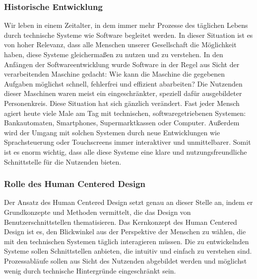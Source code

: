 \subsubsection{Historische Entwicklung}
Wir leben in einem Zeitalter, in dem immer mehr Prozesse des täglichen Lebens
durch technische Systeme wie Software begleitet werden. In dieser Situation ist
es von hoher Relevanz, dass alle Menschen unserer Gesellschaft die Möglichkeit
haben, diese Systeme gleichermaßen zu nutzen und zu verstehen. In den Anfängen
der Softwareentwicklung wurde Software in der Regel aus Sicht der
verarbeitenden Maschine gedacht: Wie kann die Maschine die gegebenen Aufgaben
möglichst schnell, fehlerfrei und effizient abarbeiten? Die Nutzenden dieser
Maschinen waren meist ein eingeschränkter, speziell dafür ausgebildeter
Personenkreis. Diese Situation hat sich gänzlich verändert. Fast jeder Mensch
agiert heute viele Male am Tag mit technischen, softwaregetriebenen Systemen:
Bankautomaten, Smartphones, Supermarktkassen oder Computer. Außerdem wird der
Umgang mit solchen Systemen durch neue Entwicklungen wie Sprachsteuerung oder
Touchscreens immer interaktiver und unmittelbarer. Somit ist es enorm wichtig,
dass alle diese Systeme eine klare und nutzungsfreundliche Schnittstelle für
die Nutzenden bieten\cite{moserTesting}.

\subsubsection{Rolle des Human Centered Design}
Der Ansatz des Human Centered Design setzt genau an dieser Stelle an, indem er
Grundkonzepte und Methoden vermittelt, die das Design von
Benutzerschnittstellen thematisieren\cite{hcd}. Das Kernkonzept des Human
Centered Design ist es, den Blickwinkel aus der Perspektive der Menschen zu
wählen, die mit den technischen Systemen täglich interagieren müssen. Die zu
entwickelnden Systeme sollen Schnittstellen anbieten, die intuitiv und einfach
zu verstehen sind. Prozessabläufe sollen aus Sicht des Nutzenden abgebildet
werden und möglichst wenig durch technische Hintergründe eingeschränkt
sein\cite{HMI-HCD}.

